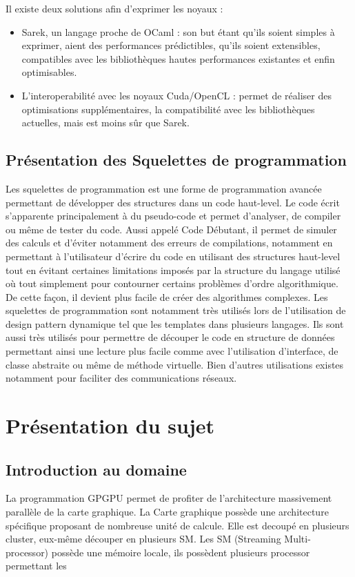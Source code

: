 \documentclass{report}
\begin{document}
Il existe deux solutions afin d’exprimer les noyaux :
\begin{itemize}

\item Sarek, un langage proche de OCaml : son but étant qu’ils soient simples à exprimer, aient des performances prédictibles, qu’ils soient extensibles, compatibles avec les bibliothèques hautes performances existantes et enfin optimisables.
\item L’interoperabilité avec les noyaux Cuda/OpenCL : permet de réaliser des optimisations supplémentaires, la compatibilité avec les bibliothèques actuelles, mais est moins sûr que Sarek.

\end{itemize}

\section{Présentation des Squelettes de programmation}
Les squelettes de programmation est une forme de programmation avancée permettant de développer des structures dans un code haut-level. Le code écrit s’apparente principalement  à du pseudo-code et permet d’analyser, de compiler ou même de tester du code. Aussi appelé Code Débutant, il permet de simuler des calculs et d’éviter notamment des erreurs de compilations, notamment en permettant à l’utilisateur d’écrire du code en utilisant des structures haut-level tout en évitant certaines limitations imposés par la structure du langage utilisé où tout simplement pour contourner certains problèmes d’ordre algorithmique. De cette façon, il devient plus facile de créer des algorithmes complexes.
Les squelettes de programmation sont notamment très utilisés lors de l’utilisation de design pattern dynamique tel que les templates dans plusieurs langages. Ils sont aussi très utilisés pour permettre de découper le code en structure de données permettant ainsi une lecture plus facile comme avec l’utilisation d'interface, de classe abstraite ou même de méthode virtuelle. Bien d’autres utilisations existes notamment pour faciliter des communications réseaux.

\chapter{Présentation du sujet}

\section{Introduction au domaine}
La programmation GPGPU permet de profiter de l’architecture massivement parallèle de la carte graphique. La Carte graphique possède une architecture spécifique proposant de nombreuse unité de calcule. Elle est decoupé en plusieurs cluster, eux-même découper en plusieurs SM. Les SM (Streaming Multi-processor) possède une mémoire locale, ils possèdent plusieurs processor permettant les 
\end{document}
